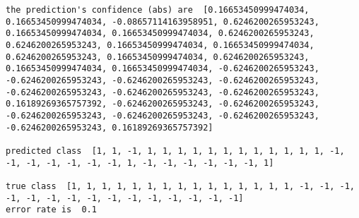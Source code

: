 \documentclass[11pt]{article}
\begin{document}
    \begin{Verbatim}[commandchars=\\\{\}]
the prediction's confidence (abs) are  [0.16653450999474034, 0.16653450999474034, -0.08657114163958951, 0.6246200265953243, 0.16653450999474034, 0.16653450999474034, 0.6246200265953243, 0.6246200265953243, 0.16653450999474034, 0.16653450999474034, 0.6246200265953243, 0.16653450999474034, 0.6246200265953243, 0.16653450999474034, 0.16653450999474034, -0.6246200265953243, -0.6246200265953243, -0.6246200265953243, -0.6246200265953243, -0.6246200265953243, -0.6246200265953243, -0.6246200265953243, 0.16189269365757392, -0.6246200265953243, -0.6246200265953243, -0.6246200265953243, -0.6246200265953243, -0.6246200265953243, -0.6246200265953243, 0.16189269365757392] 

predicted class  [1, 1, -1, 1, 1, 1, 1, 1, 1, 1, 1, 1, 1, 1, 1, -1, -1, -1, -1, -1, -1, -1, 1, -1, -1, -1, -1, -1, -1, 1] 

true class  [1, 1, 1, 1, 1, 1, 1, 1, 1, 1, 1, 1, 1, 1, 1, -1, -1, -1, -1, -1, -1, -1, -1, -1, -1, -1, -1, -1, -1, -1]
error rate is  0.1

    \end{Verbatim}
\end{document}
